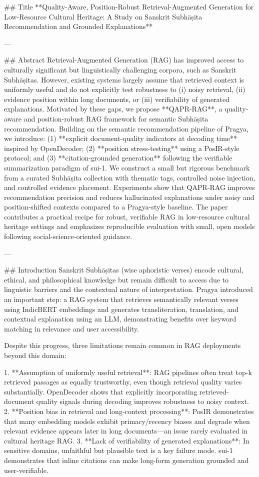 ## Title  
**Quality-Aware, Position-Robust Retrieval-Augmented Generation for Low-Resource Cultural Heritage: A Study on Sanskrit Subhāṣita Recommendation and Grounded Explanations**

---

## Abstract  
Retrieval-Augmented Generation (RAG) has improved access to culturally significant but linguistically challenging corpora, such as Sanskrit Subhāṣitas. However, existing systems largely assume that retrieved context is uniformly useful and do not explicitly test robustness to (i) noisy retrieval, (ii) evidence position within long documents, or (iii) verifiability of generated explanations. Motivated by these gaps, we propose **QAPR-RAG**, a quality-aware and position-robust RAG framework for semantic Subhāṣita recommendation. Building on the semantic recommendation pipeline of Pragya, we introduce: (1) **explicit document-quality indicators at decoding time** inspired by OpenDecoder; (2) **position stress-testing** using a PosIR-style protocol; and (3) **citation-grounded generation** following the verifiable summarization paradigm of sui-1. We construct a small but rigorous benchmark from a curated Subhāṣita collection with thematic tags, controlled noise injection, and controlled evidence placement. Experiments show that QAPR-RAG improves recommendation precision and reduces hallucinated explanations under noisy and position-shifted contexts compared to a Pragya-style baseline. The paper contributes a practical recipe for robust, verifiable RAG in low-resource cultural heritage settings and emphasizes reproducible evaluation with small, open models following social-science-oriented guidance.

---

## Introduction  
Sanskrit Subhāṣitas (wise aphoristic verses) encode cultural, ethical, and philosophical knowledge but remain difficult to access due to linguistic barriers and the contextual nature of interpretation. Pragya introduced an important step: a RAG system that retrieves semantically relevant verses using IndicBERT embeddings and generates transliteration, translation, and contextual explanation using an LLM, demonstrating benefits over keyword matching in relevance and user accessibility.

Despite this progress, three limitations remain common in RAG deployments beyond this domain:

1. **Assumption of uniformly useful retrieval**: RAG pipelines often treat top-k retrieved passages as equally trustworthy, even though retrieval quality varies substantially. OpenDecoder shows that explicitly incorporating retrieved-document quality signals during decoding improves robustness to noisy context.
2. **Position bias in retrieval and long-context processing**: PosIR demonstrates that many embedding models exhibit primacy/recency biases and degrade when relevant evidence appears later in long documents—an issue rarely evaluated in cultural heritage RAG.
3. **Lack of verifiability of generated explanations**: In sensitive domains, unfaithful but plausible text is a key failure mode. sui-1 demonstrates that inline citations can make long-form generation grounded and user-verifiable.

